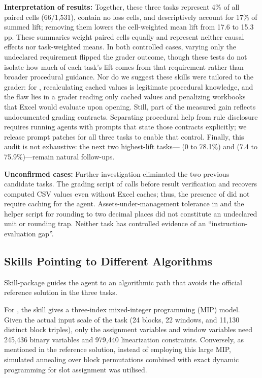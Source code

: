 \documentclass[10pt,conference]{IEEEtran}
\begin{document}
\textbf{Interpretation of results:} Together, these three tasks represent 4\% of all paired cells (66/1,531), contain no loss cells, and descriptively account for 17\% of summed lift; removing them lowers the cell-weighted mean lift from 17.6 to 15.3\,pp. These summaries weight paired cells equally and represent neither causal effects nor task-weighted means. In both controlled cases, varying only the undeclared requirement flipped the grader outcome, though these tests do not isolate how much of each task's lift comes from that requirement rather than broader procedural guidance. Nor do we suggest these skills were tailored to the grader: for , recalculating cached values is legitimate procedural knowledge, and the flaw lies in a grader reading only cached values and penalizing workbooks that Excel would evaluate upon opening. Still, part of the measured gain reflects undocumented grading contracts. Separating procedural help from rule disclosure requires running agents with prompts that state those contracts explicitly; we release prompt patches for all three tasks to enable that control. Finally, this audit is not exhaustive: the next two highest-lift tasks--- (0 to 78.1\%) and  (7.4 to 75.9\%)---remain natural follow-ups.

\leavevmode{} \textbf{Unconfirmed cases:} Further investigation eliminated the two previous candidate tasks. The grading script of  calls  before result verification and recovers computed CSV values even without Excel caches; thus, the presence of  did not require caching for the agent. Assets-under-management tolerance in  and the helper script for rounding to two decimal places did not constitute an undeclared unit or rounding trap. Neither task has controlled evidence of an ``instruction-evaluation gap''.

\subsection{Skills Pointing to Different Algorithms}
Skill-package guides the agent to an algorithmic path that avoids the official reference solution in the three tasks.

For , the skill gives a three-index mixed-integer programming (MIP) model. Given the actual input scale of the task (24 blocks, 22 windows, and 11,130 distinct block triples), only the assignment variables and window variables need 245,436 binary variables and 979,440 linearization constraints. Conversely, as mentioned in the reference solution, instead of employing this large MIP, simulated annealing over block permutations combined with exact dynamic programming for slot assignment was utilised.
\end{document}
